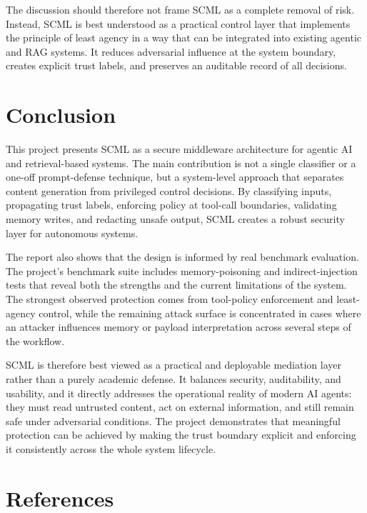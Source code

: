 \documentclass[12pt]{article}
\begin{document}
The discussion should therefore not frame SCML as a complete removal of risk. Instead, SCML is best understood as a practical control layer that implements the principle of least agency in a way that can be integrated into existing agentic and RAG systems. It reduces adversarial influence at the system boundary, creates explicit trust labels, and preserves an auditable record of all decisions.

\section{Conclusion}

This project presents SCML as a secure middleware architecture for agentic AI and retrieval-based systems. The main contribution is not a single classifier or a one-off prompt-defense technique, but a system-level approach that separates content generation from privileged control decisions. By classifying inputs, propagating trust labels, enforcing policy at tool-call boundaries, validating memory writes, and redacting unsafe output, SCML creates a robust security layer for autonomous systems.

The report also shows that the design is informed by real benchmark evaluation. The project's benchmark suite includes memory-poisoning and indirect-injection tests that reveal both the strengths and the current limitations of the system. The strongest observed protection comes from tool-policy enforcement and least-agency control, while the remaining attack surface is concentrated in cases where an attacker influences memory or payload interpretation across several steps of the workflow.

SCML is therefore best viewed as a practical and deployable mediation layer rather than a purely academic defense. It balances security, auditability, and usability, and it directly addresses the operational reality of modern AI agents: they must read untrusted content, act on external information, and still remain safe under adversarial conditions. The project demonstrates that meaningful protection can be achieved by making the trust boundary explicit and enforcing it consistently across the whole system lifecycle.

\section{References}
\end{document}
